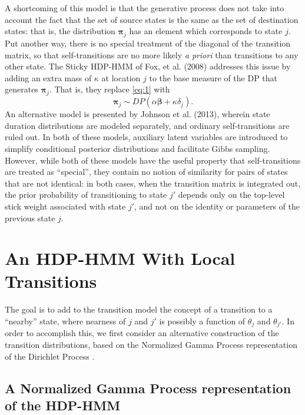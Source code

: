 \documentclass[12pt,letterpaper]{report}
\newcommand{\bbeta}{\boldsymbol{\beta}}
\newcommand{\bpi}{\boldsymbol{\pi}}
\begin{document}
A shortcoming of this model is that the generative process does not
take into account the fact that the set of source states is the same
as the set of destination states: that is, the distribution $\bpi_j$
has an element which corresponds to state $j$.  Put another way, there
is no special treatment of the diagonal of the transition matrix, so
that self-transitions are no more likely {\it a priori} than
transitions to any other state.  The Sticky HDP-HMM of Fox, et
al. (2008) addresses this issue by adding an extra mass of $\kappa$ at location $j$ to the base
measure of the DP that generates $\bpi_j$.  That is, they replace
\eqref{eq:1} with
\begin{equation}
  \label{eq:6}
  \bpi_j \sim DP(\alpha\bbeta + \kappa \delta_j).
\end{equation}
An alternative model is presented by Johnson et al. (2013), wherein 
state duration distributions are modeled
separately, and ordinary self-transitions are ruled out.  In both of
these models, auxiliary latent variables are introduced to simplify
conditional posterior distributions and facilitate Gibbs sampling.
However, while both of these models have the useful property that
self-transitions are treated as ``special'', they contain no notion of
similarity for pairs of states that are not identical: 
in both cases, when the transition matrix
is integrated out, the prior probability of
transitioning to state $j'$ depends only on the top-level stick
weight associated with state $j'$, and not on the identity or
parameters of the previous state $j$.

\section{An HDP-HMM With Local Transitions}

The goal is to add to the transition model the concept of a transition to
a ``nearby'' state, where nearness of $j$ and $j'$ is possibly a function of
$\theta_j$ and $\theta_{j'}$.  In order to accomplish this, we first
consider an alternative construction of the transition distributions,
based on the Normalized Gamma Process representation of the Dirichlet
Process \citep{ferguson1973bayesian}.

\subsection{A Normalized Gamma Process representation of the HDP-HMM}
\label{sec:normalized-gamma}
\end{document}
